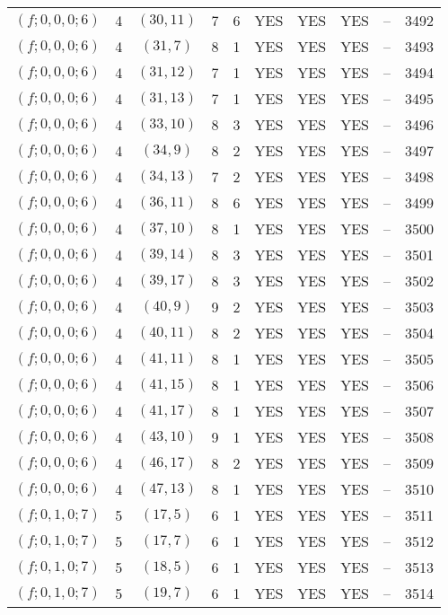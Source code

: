 \begin{longtable}{|c|c|c|c|c|c|c|c|c|c|}
$(f; 0, 0, 0; 6)$ & 4 & $(30, 11)$ & 7 & 6 & YES & YES & YES & -- & 3492\\
$(f; 0, 0, 0; 6)$ & 4 & $(31, 7)$ & 8 & 1 & YES & YES & YES & -- & 3493\\
$(f; 0, 0, 0; 6)$ & 4 & $(31, 12)$ & 7 & 1 & YES & YES & YES & -- & 3494\\
$(f; 0, 0, 0; 6)$ & 4 & $(31, 13)$ & 7 & 1 & YES & YES & YES & -- & 3495\\
$(f; 0, 0, 0; 6)$ & 4 & $(33, 10)$ & 8 & 3 & YES & YES & YES & -- & 3496\\
$(f; 0, 0, 0; 6)$ & 4 & $(34, 9)$ & 8 & 2 & YES & YES & YES & -- & 3497\\
$(f; 0, 0, 0; 6)$ & 4 & $(34, 13)$ & 7 & 2 & YES & YES & YES & -- & 3498\\
$(f; 0, 0, 0; 6)$ & 4 & $(36, 11)$ & 8 & 6 & YES & YES & YES & -- & 3499\\
$(f; 0, 0, 0; 6)$ & 4 & $(37, 10)$ & 8 & 1 & YES & YES & YES & -- & 3500\\
$(f; 0, 0, 0; 6)$ & 4 & $(39, 14)$ & 8 & 3 & YES & YES & YES & -- & 3501\\
$(f; 0, 0, 0; 6)$ & 4 & $(39, 17)$ & 8 & 3 & YES & YES & YES & -- & 3502\\
$(f; 0, 0, 0; 6)$ & 4 & $(40, 9)$ & 9 & 2 & YES & YES & YES & -- & 3503\\
$(f; 0, 0, 0; 6)$ & 4 & $(40, 11)$ & 8 & 2 & YES & YES & YES & -- & 3504\\
$(f; 0, 0, 0; 6)$ & 4 & $(41, 11)$ & 8 & 1 & YES & YES & YES & -- & 3505\\
$(f; 0, 0, 0; 6)$ & 4 & $(41, 15)$ & 8 & 1 & YES & YES & YES & -- & 3506\\
$(f; 0, 0, 0; 6)$ & 4 & $(41, 17)$ & 8 & 1 & YES & YES & YES & -- & 3507\\
$(f; 0, 0, 0; 6)$ & 4 & $(43, 10)$ & 9 & 1 & YES & YES & YES & -- & 3508\\
$(f; 0, 0, 0; 6)$ & 4 & $(46, 17)$ & 8 & 2 & YES & YES & YES & -- & 3509\\
$(f; 0, 0, 0; 6)$ & 4 & $(47, 13)$ & 8 & 1 & YES & YES & YES & -- & 3510\\
$(f; 0, 1, 0; 7)$ & 5 & $(17, 5)$ & 6 & 1 & YES & YES & YES & -- & 3511\\
$(f; 0, 1, 0; 7)$ & 5 & $(17, 7)$ & 6 & 1 & YES & YES & YES & -- & 3512\\
$(f; 0, 1, 0; 7)$ & 5 & $(18, 5)$ & 6 & 1 & YES & YES & YES & -- & 3513\\
$(f; 0, 1, 0; 7)$ & 5 & $(19, 7)$ & 6 & 1 & YES & YES & YES & -- & 3514\\

\end{longtable}
